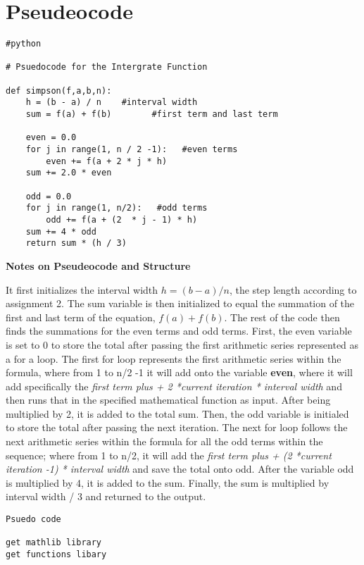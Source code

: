 \documentclass[11pt]{article} %
\begin{document}
\section*{Pseudeocode}
\begin{flushleft}
\begin{lstlisting}
#python

# Psuedocode for the Intergrate Function

def simpson(f,a,b,n):  
    h = (b - a) / n    #interval width
    sum = f(a) + f(b)        #first term and last term
    
    even = 0.0
    for j in range(1, n / 2 -1):   #even terms
        even += f(a + 2 * j * h)
    sum += 2.0 * even
    
    odd = 0.0
    for j in range(1, n/2):   #odd terms
        odd += f(a + (2  * j - 1) * h)
    sum += 4 * odd
    return sum * (h / 3) 

\end{lstlisting}
\small{\textbf{Notes on Pseudeocode and Structure}}

It first initializes the interval width \(h = (b - a) / n\), the step length according to assignment 2.
The sum variable is then initialized to equal the summation of the first and last term of the equation,
\(f(a) + f(b)\). The rest of the code then finds the summations for the even terms and odd terms. 
First, the even variable is set to 0 to store the total after passing the first arithmetic series 
represented as a for a loop. The first for loop represents the first arithmetic series within the formula, 
where from 1 to n/2 -1 it will add onto the variable \textbf{even}, where it will add specifically the \emph{first term 
plus + 2 *current iteration * interval width} and then runs that in the specified mathematical function as 
input. After being multiplied by 2, it is added to the total sum. Then, the odd variable is initialed to 
store the total after passing the next iteration. The next for loop follows the next arithmetic series 
within the formula for all the odd terms within the sequence; where from 1 to n/2, it will add the \emph{first 
term plus + (2 *current iteration -1) * interval width} and save the total onto odd. 
After the variable odd is multiplied by 4, it is added to the sum. Finally, the sum is multiplied by 
interval width / 3 and returned to the output.

\begin{lstlisting}
Psuedo code

get mathlib library
get functions libary 



\end{lstlisting}
\end{flushleft}
\end{document}

